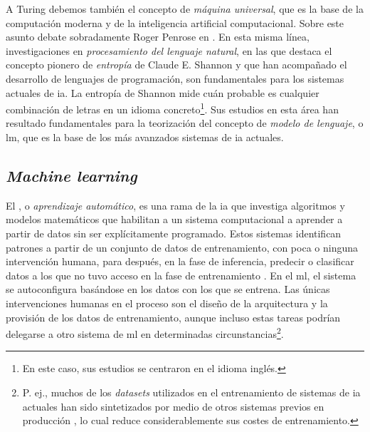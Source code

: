 
A Turing debemos también el concepto de \emph{máquina universal}, que es la base de la computación moderna y de la inteligencia artificial computacional. Sobre este asunto debate sobradamente Roger Penrose en \cite{penroseNuevaMenteEmperador2015}. En esta misma línea, investigaciones en \emph{procesamiento del lenguaje natural}, en las que destaca el concepto pionero de \emph{entropía} de Claude E. Shannon \citep{shannon1951prediction} y que han acompañado el desarrollo de lenguajes de programación, son fundamentales para los sistemas actuales de \gls{ia}. La entropía de Shannon mide cuán probable es cualquier combinación de letras en un idioma concreto\footnote{En este caso, sus estudios se centraron en el idioma inglés.}. Sus estudios en esta área han resultado fundamentales para la teorización del concepto de \emph{modelo de lenguaje}, o \gls{lm}, que es la base de los más avanzados sistemas de \gls{ia} actuales.


\subsection{\emph{Machine learning}}

El , o \emph{aprendizaje automático}, es una rama de la \gls{ia} que investiga algoritmos y modelos matemáticos que habilitan a un sistema computacional a aprender a partir de datos sin ser explícitamente programado. Estos sistemas identifican patrones a partir de un conjunto de datos de entrenamiento, con poca o ninguna intervención humana, para después, en la fase de inferencia, predecir o clasificar datos a los que no tuvo acceso en la fase de entrenamiento \citep{gollapudi2016practical}. En el \gls{ml}, el sistema se autoconfigura basándose en los datos con los que se entrena. Las únicas intervenciones humanas en el proceso son el diseño de la arquitectura y la provisión de los datos de entrenamiento, aunque incluso estas tareas podrían delegarse a otro sistema de \gls{ml} en determinadas circunstancias\footnote{P. ej., muchos de los \emph{datasets} utilizados en el entrenamiento de sistemas de \gls{ia} actuales han sido sintetizados por medio de otros sistemas previos en producción \citep{liSyntheticDataGeneration2023}, lo cual reduce considerablemente sus costes de entrenamiento.}.

